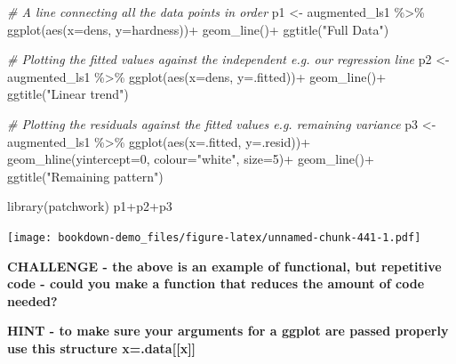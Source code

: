 \documentclass[
]{book}
\newenvironment{Shaded}{\begin{snugshade}}{\end{snugshade}}
\newcommand{\AttributeTok}[1]{\textcolor[rgb]{0.77,0.63,0.00}{#1}}
\newcommand{\CommentTok}[1]{\textcolor[rgb]{0.56,0.35,0.01}{\textit{#1}}}
\newcommand{\DecValTok}[1]{\textcolor[rgb]{0.00,0.00,0.81}{#1}}
\newcommand{\FunctionTok}[1]{\textcolor[rgb]{0.00,0.00,0.00}{#1}}
\newcommand{\NormalTok}[1]{#1}
\newcommand{\OtherTok}[1]{\textcolor[rgb]{0.56,0.35,0.01}{#1}}
\newcommand{\SpecialCharTok}[1]{\textcolor[rgb]{0.00,0.00,0.00}{#1}}
\newcommand{\StringTok}[1]{\textcolor[rgb]{0.31,0.60,0.02}{#1}}
\begin{document}
\begin{Shaded}
\begin{Highlighting}[]
\CommentTok{\# A line connecting all the data points in order }
\NormalTok{p1 }\OtherTok{\textless{}{-}}\NormalTok{ augmented\_ls1 }\SpecialCharTok{\%\textgreater{}\%} 
  \FunctionTok{ggplot}\NormalTok{(}\FunctionTok{aes}\NormalTok{(}\AttributeTok{x=}\NormalTok{dens, }\AttributeTok{y=}\NormalTok{hardness))}\SpecialCharTok{+}
  \FunctionTok{geom\_line}\NormalTok{()}\SpecialCharTok{+}
  \FunctionTok{ggtitle}\NormalTok{(}\StringTok{"Full Data"}\NormalTok{)}

\CommentTok{\# Plotting the fitted values against the independent e.g. our regression line}
\NormalTok{p2 }\OtherTok{\textless{}{-}}\NormalTok{ augmented\_ls1 }\SpecialCharTok{\%\textgreater{}\%} 
  \FunctionTok{ggplot}\NormalTok{(}\FunctionTok{aes}\NormalTok{(}\AttributeTok{x=}\NormalTok{dens, }\AttributeTok{y=}\NormalTok{.fitted))}\SpecialCharTok{+}
  \FunctionTok{geom\_line}\NormalTok{()}\SpecialCharTok{+}
  \FunctionTok{ggtitle}\NormalTok{(}\StringTok{"Linear trend"}\NormalTok{)}

\CommentTok{\# Plotting the residuals against the fitted values e.g. remaining variance}
\NormalTok{p3 }\OtherTok{\textless{}{-}}\NormalTok{ augmented\_ls1 }\SpecialCharTok{\%\textgreater{}\%} 
  \FunctionTok{ggplot}\NormalTok{(}\FunctionTok{aes}\NormalTok{(}\AttributeTok{x=}\NormalTok{.fitted, }\AttributeTok{y=}\NormalTok{.resid))}\SpecialCharTok{+}
  \FunctionTok{geom\_hline}\NormalTok{(}\AttributeTok{yintercept=}\DecValTok{0}\NormalTok{, }\AttributeTok{colour=}\StringTok{"white"}\NormalTok{, }\AttributeTok{size=}\DecValTok{5}\NormalTok{)}\SpecialCharTok{+}
  \FunctionTok{geom\_line}\NormalTok{()}\SpecialCharTok{+}
  \FunctionTok{ggtitle}\NormalTok{(}\StringTok{"Remaining pattern"}\NormalTok{)}


\FunctionTok{library}\NormalTok{(patchwork)}
\NormalTok{p1}\SpecialCharTok{+}\NormalTok{p2}\SpecialCharTok{+}\NormalTok{p3}
\end{Highlighting}
\end{Shaded}

\texttt{[image: bookdown-demo\_files/figure-latex/unnamed-chunk-441-1.pdf]}

\textbf{CHALLENGE - the above is an example of functional, but repetitive code - could you make a function that reduces the amount of code needed?}

\textbf{HINT - to make sure your arguments for a ggplot are passed properly use this structure x=.data{[}{[}x{]}{]}}
\end{document}
